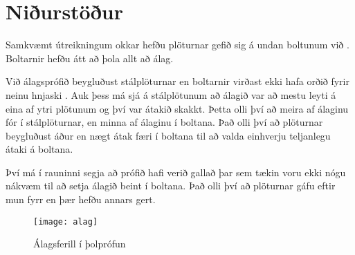 
\section{Niðurstöður}
\label{sec:nidurstodur}

Samkvæmt útreikningum okkar hefðu plöturnar gefið sig á undan boltunum við .
Boltarnir hefðu átt að þola allt að  álag.


Við álagsprófið beygluðust stálplöturnar en boltarnir virðast ekki hafa orðið fyrir neinu hnjaski .
Auk þess má sjá á stálplötunum að álagið var að mestu leyti á eina af ytri plötunum og því var átakið skakkt. Þetta olli því að meira af álaginu fór í stálplöturnar, en minna af álaginu í boltana. 
Það olli því að plöturnar beygluðust áður en nægt átak færi í boltana til að valda einhverju teljanlegu átaki á boltana.

Því má í rauninni segja að prófið hafi verið gallað þar sem tækin voru ekki nógu nákvæm til að setja álagið beint í boltana. Það olli því að plöturnar gáfu eftir mun fyrr en þær hefðu annars gert.

\begin{figure}[b]
  \centering
  \texttt{[image: alag]}
  \caption{Álagsferill í þolprófun}
  \label{fig:alag}
\end{figure}